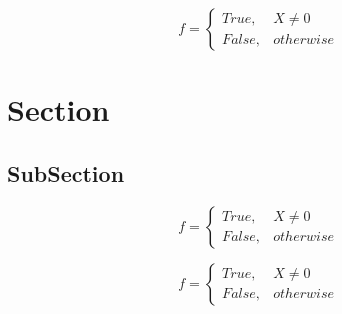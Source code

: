 \documentclass[a4paper]{article}
\begin{document}
\begin{equation}   f =
\begin{cases} True, & X \neq 0\\
False, & otherwise
\end{cases}
\end{equation}

\section{Section}

\subsection{SubSection}

\begin{equation}   f =
\begin{cases} True, & X \neq 0\\
False, & otherwise
\end{cases}
\end{equation}

\begin{equation}   f =
\begin{cases} True, & X \neq 0\\
False, & otherwise
\end{cases}
\end{equation}
\end{document}
